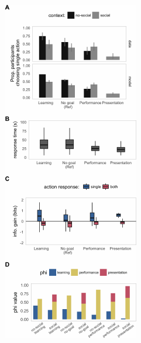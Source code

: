 \documentclass[10pt, letterpaper]{article}
\newenvironment{CodeChunk}{}{}
\begin{document}
\begin{CodeChunk}
\begin{figure}[H]

{\centering \includegraphics[width=0.9\linewidth]{figs/e2_results-1} 

}
\end{figure}
\end{CodeChunk}
\end{document}
